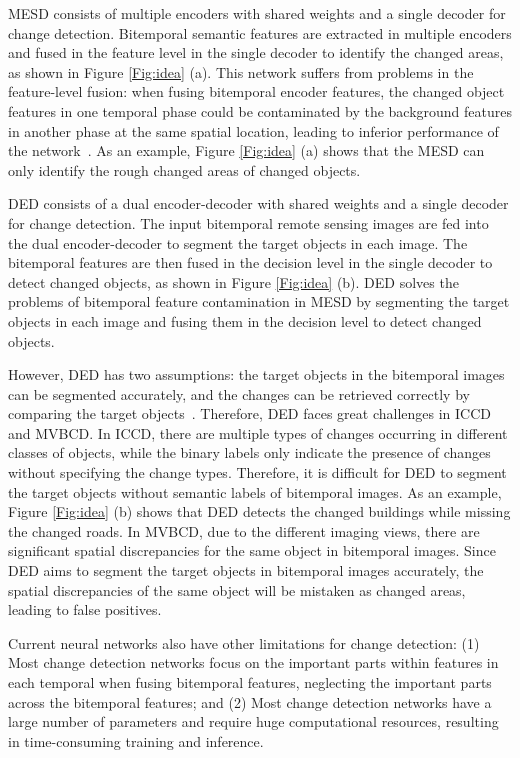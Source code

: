 \documentclass[journal]{IEEEtran}
\begin{document}
MESD consists of multiple encoders with shared weights and a single decoder for change detection. Bitemporal semantic features are extracted in multiple encoders and fused in the feature level in the single decoder to identify the changed areas, as shown in Figure \ref{Fig:idea} (a). This network suffers from problems in the feature-level fusion: when fusing bitemporal encoder features, the changed object features in one temporal phase could be contaminated by the background features in another phase at the same spatial location, leading to inferior performance of the network~\cite{fccdn}. As an example, Figure \ref{Fig:idea} (a) shows that the MESD can only identify the rough changed areas of changed objects.

DED consists of a dual encoder-decoder with shared weights and a single decoder for change detection. The input bitemporal remote sensing images are fed into the dual encoder-decoder to segment the target objects in each image. The bitemporal features are then fused in the decision level in the single decoder to detect changed objects, as shown in Figure \ref{Fig:idea} (b). DED solves the problems of bitemporal feature contamination in MESD by segmenting the target objects in each image and fusing them in the decision level to detect changed objects.

However, DED has two assumptions: the target objects in the bitemporal images can be segmented accurately, and the changes can be retrieved correctly by comparing the target objects~\cite{fccdn}. Therefore, DED faces great challenges in ICCD and MVBCD. In ICCD, there are multiple types of changes occurring in different classes of objects, while the binary labels only indicate the presence of changes without specifying the change types. Therefore, it is difficult for DED to segment the target objects without semantic labels of bitemporal images. As an example, Figure \ref{Fig:idea} (b) shows that DED detects the changed buildings while missing the changed roads. In MVBCD, due to the different imaging views, there are significant spatial discrepancies for the same object in bitemporal images. Since DED aims to segment the target objects in bitemporal images accurately, the spatial discrepancies of the same object will be mistaken as changed areas, leading to false positives.

Current neural networks also have other limitations for change detection: (1) Most change detection networks focus on the important parts within features in each temporal when fusing bitemporal features, neglecting the important parts across the bitemporal features; and (2) Most change detection networks have a large number of parameters and require huge computational resources, resulting in time-consuming training and inference.
\end{document}
